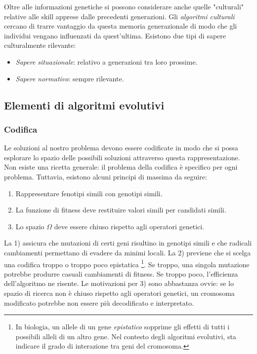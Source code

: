 \documentclass[10pt,a4paper]{article}
\begin{document}
Oltre alle informazioni genetiche si possono considerare anche quelle "culturali" relative alle skill apprese dalle precedenti generazioni. Gli \emph{algoritmi culturali} cercano di trarre vantaggio da questa memoria generazionale di modo che gli individui vengano influenzati da quest'ultima. Esistono due tipi di sapere culturalmente rilevante:

\begin{itemize}
\item{\emph{Sapere situazionale}: relativo a generazioni tra loro prossime.}
\item{\emph{Sapere normativo}: sempre rilevante.}
\end{itemize}

\subsection{Elementi di algoritmi evolutivi}

\subsubsection{Codifica}

Le soluzioni al nostro problema devono essere codificate in modo che si possa esplorare lo spazio delle possibili soluzioni attraverso questa rappresentazione. Non esiste una ricetta generale: il problema della codifica è specifico per ogni problema. Tuttavia, esistono alcuni principi di massima da seguire:

\begin{enumerate}
\item{Rappresentare fenotipi simili con genotipi simili.}
\item{La funzione di fitness deve restituire valori simili per candidati simili.}
\item{Lo spazio $\Omega$ deve essere chiuso rispetto agli operatori genetici.}
\end{enumerate}

La 1) assicura che mutazioni di certi geni risultino in genotipi simili e che radicali cambiamenti permettano di evadere da minimi locali. La 2) previene che si scelga una codifica troppo o troppo poco epistatica \footnote{In biologia, un allele di un gene \emph{epistatico} sopprime gli effetti di tutti i possibili alleli di un altro gene. Nel contesto degli algoritmi evolutivi, sta indicare il grado di interazione tra geni del cromosoma.}. Se troppo, una singola mutazione potrebbe produrre casuali cambiamenti di fitness. Se troppo poco, l'efficienza dell'algoritmo ne risente. Le motivazioni per 3) sono abbastanza ovvie: se lo spazio di ricerca non è chiuso rispetto agli operatori genetici, un cromosoma modificato potrebbe non essere più decodificato e interpretato.  
\end{document}
